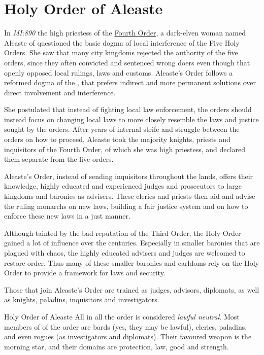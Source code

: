 \section{Holy Order of Aleaste}
\label{sec:Holy Order of Aleaste}

In \emph{MI:890} the high priestess of the
\hyperref[sec:Four Holy Orders]{Fourth Order}, a dark-elven woman named
Aleaste of  questioned the basic dogma of local
interference of the Five Holy Orders. She saw that many city kingdoms rejected
the authority of the five orders, since they often convicted and sentenced
wrong doers even though that openly opposed local rulings, laws and customs.
Aleaste's Order follows a reformed dogma of the , that
prefers indirect and more permanent solutions over direct involvement and
interference.

She postulated that instead of fighting local law enforcement, the orders
should instead focus on changing local laws to more closely resemble the laws
and justice sought by the orders. After years of internal strife and struggle
between the orders on how to proceed, Aleaste took the majority knights, priests
and inquisitors of the Fourth Order, of which she was high priestess, and
declared them separate from the five orders.

Aleaste's Order, instead of sending inquisitors throughout the lands, offers
their knowledge, highly educated and experienced judges and prosecutors to
large kingdoms and baronies as advisers. These clerics and priests then aid
and advise the ruling monarchs on new laws, building a fair justice system and
on how to enforce these new laws in a just manner.

Although tainted by the bad reputation of the Third Order, the Holy Order
gained a lot of influence over the centuries. Especially in smaller baronies
that are plagued with chaos, the highly educated advisers and judges are
welcomed to restore order. Thus many of these smaller baronies and earldoms
rely on the Holy Order to provide a framework for laws and security.

Those that join Aleaste's Order are trained as judges, advisors, diplomats, as
well as knights, paladins, inquisitors and investigators.

\begin{35e}{Holy Order of Aleaste}
  All in all the order is considered \emph{lawful neutral}. Most members of
  of the order are bards (yes, they may be lawful), clerics, paladins, and even
  rogues (as investigators and diplomats). Their favoured weapon is the morning
  star, and their domains are protection, law, good and strength.
\end{35e}
